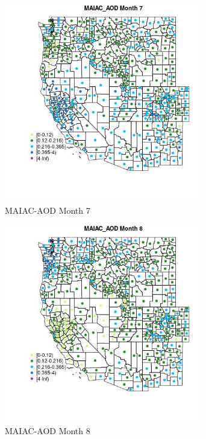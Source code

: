 \begin{figure} 
\centering  
\includegraphics[width=0.77\textwidth]{Code_Outputs/df_report_ML_predictors_CountyCentroid_Locations_Dates_2008-01-01to2018-12-31_MapObsMo7MAIAC_AOD.jpg} 
\caption{\label{fig:df_report_ML_predictors_CountyCentroid_Locations_Dates_2008-01-01to2018-12-31MapObsMo7MAIAC_AOD}MAIAC-AOD Month 7} 
\end{figure} 
 

\clearpage 

\begin{figure} 
\centering  
\includegraphics[width=0.77\textwidth]{Code_Outputs/df_report_ML_predictors_CountyCentroid_Locations_Dates_2008-01-01to2018-12-31_MapObsMo8MAIAC_AOD.jpg} 
\caption{\label{fig:df_report_ML_predictors_CountyCentroid_Locations_Dates_2008-01-01to2018-12-31MapObsMo8MAIAC_AOD}MAIAC-AOD Month 8} 
\end{figure} 
 

